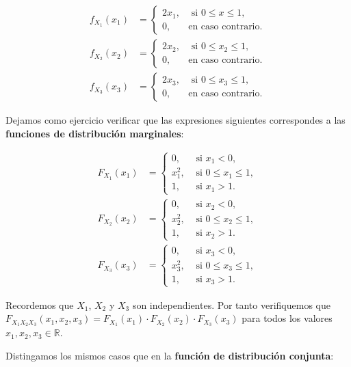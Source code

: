 \documentclass[
  letterpaper,
  DIV=11,
  numbers=noendperiod]{scrreprt}
\begin{document}
\[
\begin{array}{rl}
f_{X_1}(x_1) & =\begin{cases}
2x_1, & \mbox{ si }0\leq x\leq 1,\\
0, & \mbox{en caso contrario.}
\end{cases}\\ 
f_{X_2}(x_2)&=\begin{cases}
2x_2, & \mbox{ si }0\leq x_2\leq 1,\\
0, & \mbox{en caso contrario.}
\end{cases}\\ f_{X_3}(x_3) & =\begin{cases}
2x_3, & \mbox{ si }0\leq x_3\leq 1,\\
0, & \mbox{en caso contrario.}
\end{cases}
\end{array}
\]

Dejamos como ejercicio verificar que las expresiones siguientes
correspondes a las \textbf{funciones de distribución marginales}:

\[
\begin{array}{rl}
F_{X_1}(x_1) & =\begin{cases}
0, & \mbox{ si }x_1<0, \\
x_1^2, & \mbox{ si }0\leq x_1\leq 1,\\
1, & \mbox{ si }x_1 > 1.
\end{cases}\\
F_{X_2}(x_2) & =\begin{cases}
0, & \mbox{ si }x_2<0, \\
x_2^2, & \mbox{ si }0\leq x_2\leq 1,\\
1, & \mbox{ si }x_2 > 1.
\end{cases}\\ F_{X_3}(x_3) & =\begin{cases}
0, & \mbox{ si }x_3<0, \\
x_3^2, & \mbox{ si }0\leq x_3\leq 1,\\
1, & \mbox{ si }x_3 > 1.
\end{cases}
\end{array}
\]

Recordemos que \(X_1\), \(X_2\) y \(X_3\) son independientes. Por tanto
verifiquemos que
\(F_{X_1X_2X_3}(x_1,x_2,x_3)=F_{X_1}(x_1)\cdot F_{X_2}(x_2)\cdot F_{X_3}(x_3)\)
para todos los valores \(x_1,x_2,x_3\in\mathbb{R}\).

Distingamos los mismos casos que en la \textbf{función de distribución
conjunta}:
\end{document}
